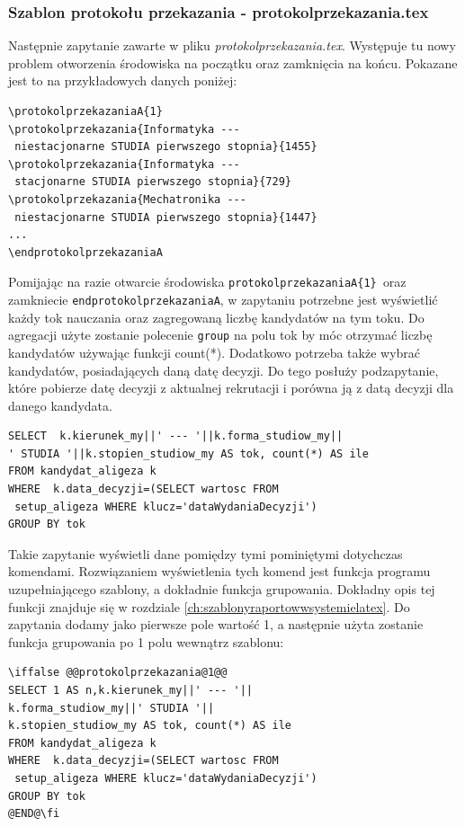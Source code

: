 \subsubsection*{Szablon protokołu przekazania -  protokolprzekazania.tex}
Następnie zapytanie zawarte w pliku \emph{protokolprzekazania.tex}. Występuje tu nowy problem otworzenia środowiska na początku oraz zamknięcia na końcu. Pokazane jest to na przykładowych danych poniżej:
 \begin{lstlisting}
\protokolprzekazaniaA{1}
\protokolprzekazania{Informatyka ---
 niestacjonarne STUDIA pierwszego stopnia}{1455}
\protokolprzekazania{Informatyka ---
 stacjonarne STUDIA pierwszego stopnia}{729}
\protokolprzekazania{Mechatronika ---
 niestacjonarne STUDIA pierwszego stopnia}{1447}
...
\endprotokolprzekazaniaA        
\end{lstlisting}
\par
Pomijając na razie otwarcie środowiska \texttt{protokolprzekazaniaA\{1\} }oraz zamkniecie \texttt{endprotokolprzekazaniaA}, w zapytaniu potrzebne jest wyświetlić każdy tok nauczania oraz zagregowaną liczbę kandydatów na tym toku. Do agregacji użyte zostanie polecenie \texttt{group} na polu tok by móc otrzymać liczbę kandydatów używając funkcji count(*). Dodatkowo potrzeba także wybrać kandydatów, posiadających daną datę decyzji. Do tego posłuży podzapytanie, które pobierze datę decyzji z aktualnej rekrutacji i porówna ją z datą decyzji dla danego kandydata. 
 \begin{lstlisting}
SELECT  k.kierunek_my||' --- '||k.forma_studiow_my||
' STUDIA '||k.stopien_studiow_my AS tok, count(*) AS ile
FROM kandydat_aligeza k
WHERE  k.data_decyzji=(SELECT wartosc FROM
 setup_aligeza WHERE klucz='dataWydaniaDecyzji') 
GROUP BY tok
\end{lstlisting}
\par
Takie zapytanie wyświetli dane pomiędzy tymi pominiętymi dotychczas komendami. 
Rozwiązaniem wyświetlenia tych komend jest funkcja programu uzupełniającego szablony, a dokładnie funkcja grupowania. Dokładny opis tej funkcji znajduje się w rozdziale \ref{ch:szablonyraportowwsystemielatex}. Do zapytania dodamy jako pierwsze pole wartość 1, a następnie użyta zostanie funkcja grupowania po 1 polu wewnątrz szablonu:
 \begin{lstlisting}
\iffalse @@protokolprzekazania@1@@
SELECT 1 AS n,k.kierunek_my||' --- '||
k.forma_studiow_my||' STUDIA '||
k.stopien_studiow_my AS tok, count(*) AS ile
FROM kandydat_aligeza k
WHERE  k.data_decyzji=(SELECT wartosc FROM
 setup_aligeza WHERE klucz='dataWydaniaDecyzji') 
GROUP BY tok
@END@\fi
\end{lstlisting}

